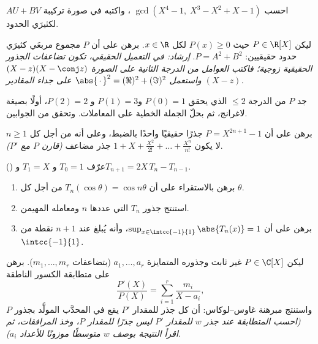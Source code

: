 \begin{exercise}[$\star\star$]\label{exo:b1:poly:6}
احسب $\gcd(X^4 - 1,\; X^3 - X^2 + X - 1)$ ، واكتبه في صورة تركيبة $AU + BV$ لكثيرَي
الحدود.
\end{exercise}

\begin{exercise}[$\star\star$]\label{exo:b1:poly:7}
ليكن $P \in \R[X]$ حيث $P(x) \geq 0$ لكل $x \in \R$. برهن على أن
$P$ مجموع مربعَي كثيرَي حدود حقيقيين: $P = A^2 + B^2$.
\emph{إرشاد: في التعميل الحقيقي، تكون تضاعفات الجذور الحقيقية
زوجية؛ فاكتب العوامل من الدرجة الثانية على الصورة $(X - z)(X - \conj z)$
واستعمل $\abs{\,\cdot\,}^2 = (\Re)^2 + (\Im)^2$ على جداء
المقادير $(X - z)$.}
\end{exercise}

\begin{exercise}[$\star\star$]\label{exo:b1:poly:8}
جد  $P$ من الدرجة $\leq 2$ الذي يحقق $P(0) = 1$ و$P(1) =
3$ و $P(2) = 2$، أولًا بصيغة لاغرانج، ثم بحلّ
الجملة الخطية على المعاملات. وتحقق من  الجوابين.
\end{exercise}

\begin{exercise}[$\star\star$]\label{exo:b1:poly:9}
برهن على أن  $P = X^{2n+1} - 1$ جذرًا حقيقيًا واحدًا بالضبط، وعلى أنه
من أجل كل $n \geq 1$ لا يكون  $1 + X + \frac{X^2}{2!} + \dots +
\frac{X^n}{n!}$ جذر مضاعف \emph{(قارن $P$ مع
$P'$)}.
\end{exercise}

\begin{exercise}[$\star\star\star$]\label{exo:b1:poly:10}
() عرّف $T_0 = 1$ و $T_1 = X$ و$T_{n+1} =
2X\,T_n - T_{n-1}$.
\begin{enumerate}
  \item برهن بالاستقراء على أن $T_n(\cos\theta) = \cos n\theta$ من أجل
        كل $\theta$.
  \item استنتج جذور $T_n$ التي عددها $n$ ومعامله المهيمن.
  \item برهن على أن $\sup_{x \in \intcc{-1}{1}} \abs{T_n(x)} = 1$،
        وأنه يُبلغ عند $n + 1$ نقطة من $\intcc{-1}{1}$.
\end{enumerate}
\end{exercise}

\begin{exercise}[$\star\star\star$]\label{exo:b1:poly:11}
ليكن $P \in \C[X]$ غير ثابت وجذوره المتمايزة $a_1, \dots,
a_r$ (بتضاعفات $m_1, \dots, m_r$). برهن على متطابقة
الكسور الناطقة
\[
\frac{P'(X)}{P(X)} = \sum_{i=1}^{r} \frac{m_i}{X - a_i},
\]
واستنتج مبرهنة غاوس--لوكاس: أن كل جذر للمقدار $P'$ يقع في
المحدَّب المولَّد بجذور $P$ \emph{(احسب المتطابقة عند
جذر $w$ للمقدار $P'$ ليس جذرًا للمقدار $P$، وخذ المرافقات، ثم
اقرأ النتيجة بوصف $w$ متوسطًا موزونًا للأعداد $a_i$)}.
\end{exercise}

